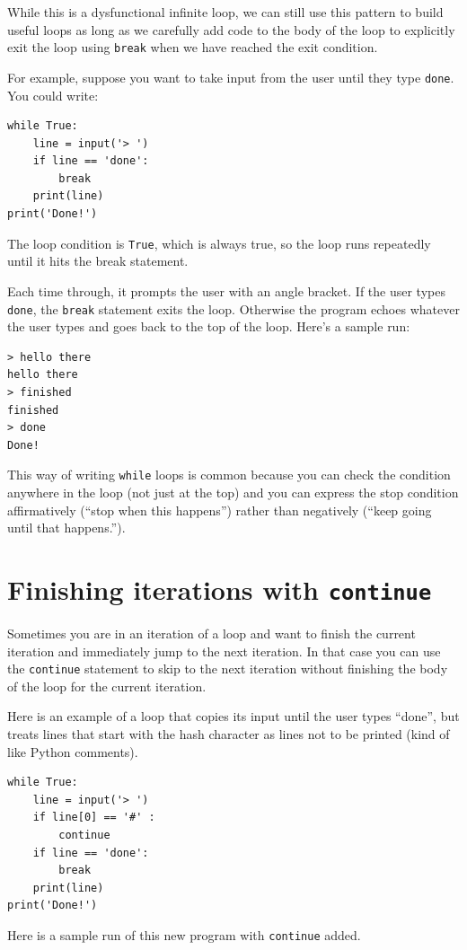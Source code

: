 While this is a dysfunctional infinite loop, we can still use this pattern
to build useful loops as long as we carefully add code to the 
body of the loop to explicitly exit the loop using {\tt break} 
when we have reached 
the exit condition.

For example, suppose you want to take input from the user until they
type {\tt done}.  You could write:

\beforeverb
\begin{verbatim}
while True:
    line = input('> ')
    if line == 'done':
        break
    print(line)
print('Done!')
\end{verbatim}
\afterverb
%
The loop condition is {\tt True}, which is always true, so the
loop runs repeatedly until it hits the break statement.

Each time through, it prompts the user with an angle bracket.
If the user types {\tt done}, the {\tt break} statement exits
the loop.  Otherwise the program echoes whatever the user types
and goes back to the top of the loop.  Here's a sample run:

\beforeverb
\begin{verbatim}
> hello there
hello there
> finished
finished
> done
Done!
\end{verbatim}
\afterverb
%
This way of writing {\tt while} loops is common because you
can check the condition anywhere in the loop (not just at the
top) and you can express the stop condition affirmatively
(``stop when this happens'') rather than negatively (``keep going
until that happens.'').

\section{Finishing iterations with {\tt continue}}

Sometimes you are in an iteration of a loop and want to finish the
current iteration and immediately jump to the next iteration.
In that case you can use the {\tt continue}
statement to skip to the next iteration without finishing the
body of the loop for the current iteration.

Here is an example of a loop that copies its input until the user
types ``done'', but treats lines that start with the hash character
as lines not to be printed (kind of like Python comments).

\beforeverb
\begin{verbatim}
while True:
    line = input('> ')
    if line[0] == '#' :
        continue
    if line == 'done':
        break
    print(line)
print('Done!')
\end{verbatim}
\afterverb
%
Here is a sample run of this new program with {\tt continue} added.

